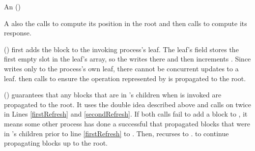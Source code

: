 An () 

A  also 
 the  calls  to compute
its position in the root 
 and then calls  to compute its response.

() first adds the block  to the invoking process's leaf.
The leaf's  field stores the first empty slot in the leaf's  array,
so the  writes  there  and then increments  .
Since  writes only to the process's own leaf, there cannot be concurrent updates to a leaf.
 then calls   to ensure the operation represented by  is propagated to the root.

() guarantees that any blocks that are in 's children when  is invoked are propagated to the root.
It uses the double  idea described
above and calls   on  twice in Lines
\ref{firstRefresh} and \ref{secondRefresh}. 
If both calls fail to add a block to , it means some other process has done a successful 
that propagated blocks that were in 's children prior to line \ref{firstRefresh} to .
Then,  recurses to . to continue propagating blocks up to the root.  

